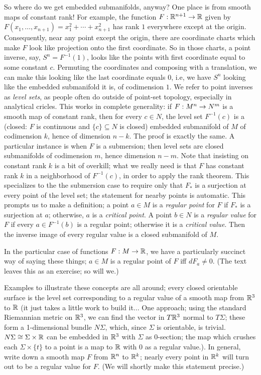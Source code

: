 So where do we get embedded submanifolds, anyway? One place is from smooth 
maps of constant rank! For example, the function $F:{\Bbb R}^{n+1}\rightarrow {\Bbb R}$ given by 
$F(x_1,\ldots ,x_{n+1})=x_1^2+\cdots +x_{n+1}^2$ has rank $1$ everywhere except at the origin.
Consequently, near any point except the origin, there are coordinate charts which make $F$ 
look like projection onto the first coordinate. So in those charts, a point inverse,
say, $S^n=F^{-1}(1)$, looks like the points with first coordinate equal to some constant $c$.
Permuting the coordinates and composing with a translation, we can make this looking
like the last coordinate equals $0$, i.e, we have $S^n$ looking like the embedded submanifold
it is, of codimension $1$. We refer to point inverses as {\it level sets}, as people often do 
outside of point-set topology, especially in analytical cricles.
This works in complete generality: if $F:M^n\rightarrow N^m$ is a smooth map of constant rank,
then for every $c\in N$, the level set $F^{-1}(c)$ is a 
(closed: $F$ is continuous and $\{c\}\subseteq N$ is closed)
embedded submanifold of $M$ of codimension $k$, hence of dimension $n-k$. The proof is
exactly the same. A particular instance is when $F$ is a submersion;
then level sets are closed submanifolds of codimension $m$, hence dimension $n-m$.
Note that insisting on constant rank $k$ is a bit of overkill; what we really
need is that $F$ has constant rank $k$ in a neighborhood of $F^{-1}(c)$, in order to apply
the rank theorem. This specializes to the the submersion case to require only that
$F_*$ is a surjection at every point of the level set; the statement for nearby points is
automatic. This prompts us to make a definition; a point $a\in M$ is a {\it regular point}
for $F$ if $F_*$ is a surjection at $a$; otherwise,
$a$ is a {\it critical point}. A point $b\in N$ is a {\it regular value}
for $F$ if every $a\in F^{-1}(b)$ is a regular point; otherwise it is a {\it critical value}.
Then the inverse image of every regular value is a closed submanifold of $M$.

\ssk

In the particular case of functions $F:M\rightarrow {\Bbb R}$, we have a particularly succinct way of saying these things; 
$a\in M$ is a regular point of $F$ iff $dF_a\neq 0$. (The text leaves this as an exercise; so will we.)

\msk

Examples to illustrate these concepts are all around; every closed orientable surface is the
level set corresponding to a regular value of a smooth map from ${\Bbb R}^3$ to ${\Bbb R}$ (it just takes a 
little work to build it... One approach; using the standard
Riemannian metric on ${\Bbb R}^3$, we can find the vector in 
$T{\Bbb R}^3$ normal to $T\Sigma$; these form a 1-dimensional bundle $N\Sigma$, which, since
$\Sigma$ is orientable, is trivial. $N\Sigma\cong \Sigma\times {\Bbb R}$ can be embedded in ${\Bbb R}^3$
with $\Sigma$ as $0$-section; the map which crushes each $\Sigma\times\{t\}$ to a point is a map 
to ${\Bbb R}$ with $0$ as a regular value.). In general, write down a smooth map $F$ from 
${\Bbb R}^n$ to ${\Bbb R}^k$; nearly 
every point in ${\Bbb R}^k$ will turn out to be a regular value for $F$. (We will shortly make this
statement precise.) 

